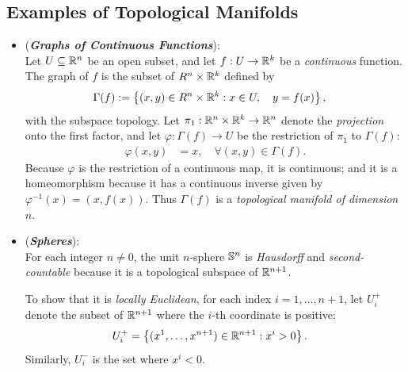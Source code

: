 \documentclass[11pt]{article}
\begin{document}
\subsection{Examples of Topological Manifolds}
\begin{itemize}
\item \begin{example} (\emph{\textbf{Graphs of Continuous Functions}}):\\
Let $U \subseteq {\mathbb R}^n$ be an open subset, and let $f:U \rightarrow {\mathbb R}^k$ be a \emph{continuous} function. The graph of $f$ is the subset of $R^n \times {\mathbb R}^k$ defined by
\begin{align*}
\Gamma(f) &:= \left\{ (x, y) \in R^n \times {\mathbb R}^k: x\in U, \quad y = f(x) \right\},
\end{align*} with the subspace topology. Let $\pi_1: {\mathbb R}^n \times {\mathbb R}^k \rightarrow {\mathbb R}^n$ denote the \emph{projection} onto the
first factor, and let $\varphi: \Gamma(f) \rightarrow U$ be the restriction of $\pi_1$ to $\Gamma(f)$: 
\begin{align*}
\varphi(x, y) &= x,\quad \forall (x, y) \in \Gamma(f).
\end{align*} Because $\varphi$ is the restriction of a continuous map, it is continuous; and it is a homeomorphism because it has a continuous inverse given by $\varphi^{-1}(x) = (x, f(x))$. Thus $\Gamma(f)$ is a \emph{topological manifold of dimension $n$}.
\end{example}

\item \begin{example} (\emph{\textbf{Spheres}}):\\
For each integer $n \neq 0$, the unit $n$-sphere ${\mathbb S}^n$ is \emph{Hausdorff} and \emph{second-countable} because it is a topological subspace of ${\mathbb R}^{n+1}$. 

To show that it is \emph{locally Euclidean}, for each index $i = 1,\ldots,n+1$,  let $U_{i}^{+}$ denote the subset of ${\mathbb R}^{n+1}$ where the $i$-th coordinate is positive:
\begin{align*}
U_{i}^{+} &= \left\{(x^1, \ldots, x^{n+1}) \in {\mathbb R}^{n+1}: x^i > 0 \right\}.
\end{align*} Similarly, $U_{i}^{-}$ is the set where $x^i < 0$.


\end{example}
\end{itemize}
\end{document}
